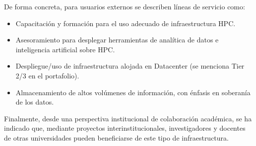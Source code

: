 De forma concreta, para usuarios externos se describen líneas de servicio como:
\begin{itemize}
  \item Capacitación y formación para el uso adecuado de infraestructura HPC.
  \item Asesoramiento para desplegar herramientas de analítica de datos e inteligencia artificial sobre HPC.
  \item Despliegue/uso de infraestructura alojada en Datacenter (se menciona Tier 2/3 en el portafolio).
  \item Almacenamiento de altos volúmenes de información, con énfasis en soberanía de los datos.
\end{itemize}
\cite{servicios_externos_zine}

Finalmente, desde una perspectiva institucional de colaboración académica, se ha indicado que, mediante proyectos interinstitucionales, investigadores y docentes de otras universidades pueden beneficiarse de este tipo de infraestructura. \cite{pesquisa_zine_2012}